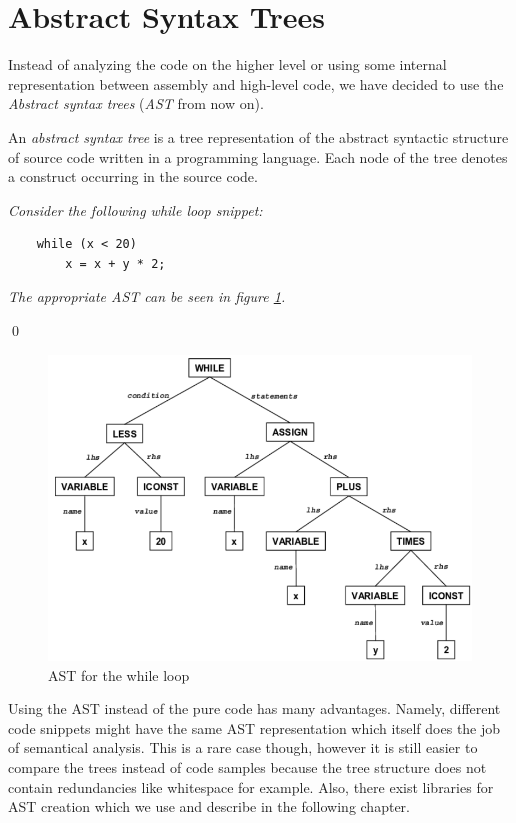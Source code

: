 \section{Abstract Syntax Trees}
\label{sec:AST}

Instead of analyzing the code on the higher level or using some internal representation between assembly and high-level code, we have decided to use the \emph{Abstract syntax trees} (\emph{AST} from now on).
\
\begin{defn}
    An \emph{abstract syntax tree} is a tree representation of the abstract syntactic structure of source code written in a programming language. Each node of the tree denotes a construct occurring in the source code.
\end{defn}

\begin{exmp}
    \textit{Consider the following while loop snippet:}

    \begin{lstlisting}
    while (x < 20)
        x = x + y * 2;
    \end{lstlisting}

    \textit{The appropriate AST can be seen in figure \ref{fig:WhileAST}.}

\qed
\end{exmp}

\begin{figure}
    \centering
    \includegraphics[scale=0.6]{res/WhileAST.PNG}
    \caption{AST for the while loop}
    \label{fig:WhileAST}
\end{figure}

Using the AST instead of the pure code has many advantages. Namely, different code snippets might have the same AST representation which itself does the job of semantical analysis. This is a rare case though, however it is still easier to compare the trees instead of code samples because the tree structure does not contain redundancies like whitespace for example. Also, there exist libraries for AST creation which we use and describe in the following chapter.
